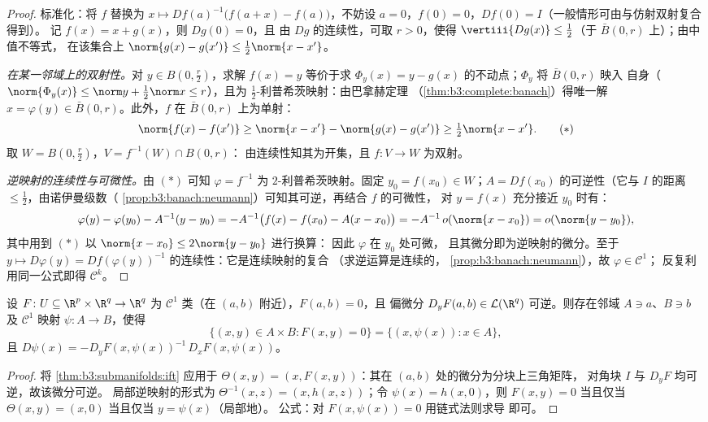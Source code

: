 \begin{proof}
标准化：将 $f$ 替换为 $x \mapsto Df(a)^{-1}\bigl(f(a +
x) - f(a)\bigr)$，不妨设 $a = 0$，$f(0) = 0$，$Df(0) =
I$（一般情形可由与仿射双射复合得到）。
记 $f(x) = x + g(x)$，则 $Dg(0) = 0$，且
由 $Dg$ 的连续性，可取 $r > 0$，使得
$\vertiii{Dg(x)} \leq \frac12$（于 $\bar B(0, r)$ 上）；由中值不等式，
在该集合上 $\norm{g(x) - g(x')} \leq \frac12
\norm{x - x'}$。

\emph{在某一邻域上的双射性。}对 $y \in B(0,
\frac r2)$，求解 $f(x) = y$ 等价于求
$\Phi_y(x) = y - g(x)$ 的不动点；$\Phi_y$ 将 $\bar B(0, r)$ 映入
自身（$\norm{\Phi_y(x)} \leq \norm y + \frac12\norm x \leq
r$），且为 $\frac12$-利普希茨映射：由巴拿赫定理
（\cref{thm:b3:complete:banach}）得唯一解
$x = \varphi(y) \in \bar B(0,r)$。此外，$f$ 在
$\bar B(0,r)$ 上为单射：
\[
\norm{f(x) - f(x')} \geq \norm{x - x'} - \norm{g(x) - g(x')}
\geq \tfrac12\norm{x - x'} .
\tag{$*$}
\]
取 $W = B(0, \frac r2)$，$V = f^{-1}(W)\cap B(0, r)$：
由连续性知其为开集，且 $f \colon V \to W$ 为双射。

\emph{逆映射的连续性与可微性。}由 $(*)$ 可知
$\varphi = f^{-1}$ 为 $2$-利普希茨映射。固定 $y_0 = f(x_0)
\in W$；$A = Df(x_0)$ 的可逆性（它与 $I$ 的距离
$\leq \frac12$，由诺伊曼级数（
\cref{prop:b3:banach:neumann}）可知其可逆，再结合 $f$ 的可微性，
对 $y = f(x)$ 充分接近 $y_0$ 时有：
\[
\varphi(y) - \varphi(y_0) - A^{-1}(y - y_0)
= -A^{-1}\bigl(f(x) - f(x_0) - A(x - x_0)\bigr)
= -A^{-1}\,o(\norm{x - x_0}) = o(\norm{y - y_0}),
\]
其中用到 $(*)$ 以 $\norm{x - x_0} \leq 2\norm{y - y_0}$ 进行换算：
因此 $\varphi$ 在 $y_0$ 处可微，
且其微分即为逆映射的微分。至于 $y \mapsto D\varphi(y) =
Df(\varphi(y))^{-1}$ 的连续性：它是连续映射的复合
（求逆运算是连续的，
\cref{prop:b3:banach:neumann}），故 $\varphi \in \mathcal C^1$；
反复利用同一公式即得 $\mathcal C^k$。
\end{proof}

\begin{theorem}[隐函数定理]
\label{thm:b3:submanifolds:implicit}
设 $F \colon U \subseteq \R^p\times\R^q \to \R^q$ 为
$\mathcal C^1$ 类（在 $(a, b)$ 附近），$F(a,b) = 0$，且
偏微分 $D_yF(a,b) \in \mathcal L(\R^q)$
可逆。则存在邻域 $A \ni a$、$B \ni b$
及 $\mathcal C^1$ 映射 $\psi \colon A \to B$，使得
\[
\bigl\{(x, y)\in A\times B : F(x,y) = 0\bigr\}
= \{(x, \psi(x)) : x \in A\},
\]
且 $D\psi(x) = -D_yF(x, \psi(x))^{-1}\,D_xF(x,
\psi(x))$。
\end{theorem}

\begin{proof}
将 \cref{thm:b3:submanifolds:ift} 应用于 $\Theta(x, y) = (x,
F(x,y))$：其在 $(a,b)$ 处的微分为分块上三角矩阵，
对角块 $I$ 与 $D_yF$ 均可逆，故该微分可逆。
局部逆映射的形式为 $\Theta^{-1}(x, z) = (x, h(x,
z))$；令 $\psi(x) = h(x, 0)$，则 $F(x, y) = 0$ 当且仅当
$\Theta(x,y) = (x, 0)$ 当且仅当 $y = \psi(x)$（局部地）。
公式：对 $F(x, \psi(x)) = 0$ 用链式法则求导
即可。
\end{proof}

